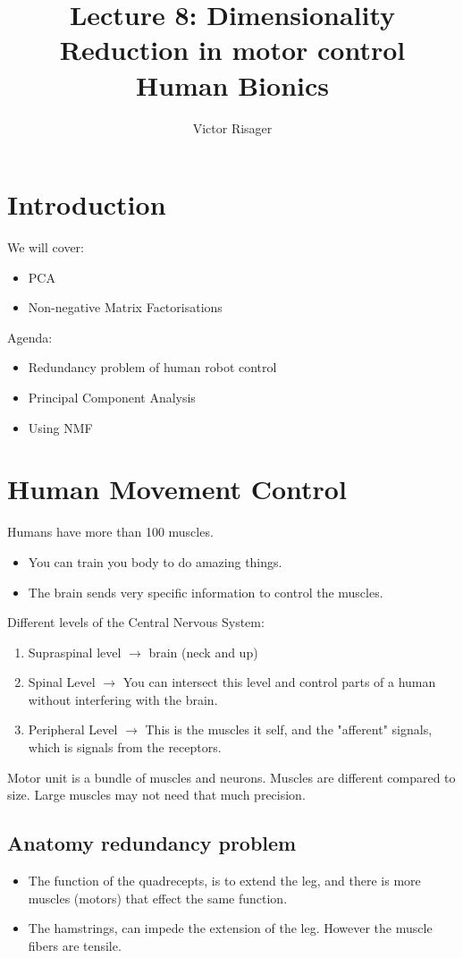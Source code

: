 \documentclass[a4paper]{article}
\title{Lecture 8: Dimensionality Reduction in motor control  \\
	\large Human Bionics}
\author{Victor Risager}
\begin{document}
\maketitle
\section{Introduction}
We will cover:
\begin{itemize}
	\item PCA
	\item Non-negative Matrix Factorisations
\end{itemize}

Agenda:
\begin{itemize}
	\item Redundancy problem of human robot control
	\item Principal Component Analysis
	\item Using NMF
\end{itemize}

\section{Human Movement Control}
Humans have more than 100 muscles. 
\begin{itemize}
	\item You can train you body to do amazing things.
	\item The brain sends very specific information to control the muscles.
\end{itemize}

Different levels of the Central Nervous System:
\begin{enumerate}
	\item Supraspinal level $ \rightarrow $  brain (neck and up)
	\item Spinal Level $ \rightarrow $ You can intersect this level and control parts of a human without interfering with the brain.
	\item Peripheral Level $ \rightarrow $ This is the muscles it self, and the "afferent" signals, which is signals from the receptors.
\end{enumerate}

Motor unit is a bundle of muscles and neurons. Muscles are different compared to size. Large muscles may not need that much precision. 

\subsection{Anatomy redundancy problem}
\begin{itemize}
	\item The function of the quadrecepts, is to extend the leg, and there is more muscles (motors) that effect the same function.
	\item The hamstrings, can impede the extension of the leg. However the muscle fibers are tensile.
\end{itemize}
\end{document}
